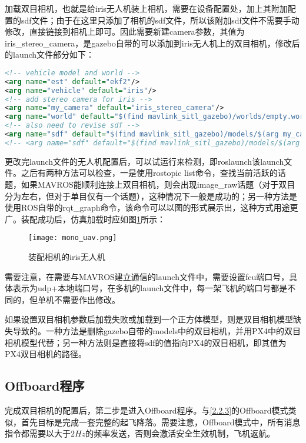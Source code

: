 加载双目相机，也就是给iris无人机装上相机，需要在设备配置处，加上其附加配置的sdf文件；由于在这里只添加了相机的sdf文件，所以该附加sdf文件不需要手动修改，直接链接到相机上即可。因此需要新建camera参数，其值为iris\_stereo\_camera，是gazebo自带的可以添加到iris无人机上的双目相机，修改后的launch文件部分如下：

\begin{lstlisting}[language={XML}]
<!-- vehicle model and world -->
<arg name="est" default="ekf2"/>
<arg name="vehicle" default="iris"/>
<!-- add stereo camera for iris -->
<arg name="my_camera" default="iris_stereo_camera"/>
<arg name="world" default="$(find mavlink_sitl_gazebo)/worlds/empty.world"/>
<!-- also need to revise sdf -->
<arg name="sdf" default="$(find mavlink_sitl_gazebo)/models/$(arg my_camera)/$(arg my_camera).sdf"/>
<!-- <arg name="sdf" default="$(find mavlink_sitl_gazebo)/models/$(arg vehicle)/$(arg vehicle).sdf"/> -->
\end{lstlisting}

更改完launch文件的无人机配置后，可以试运行来检测，即roslaunch该launch文件。之后有两种方法可以检查，一是使用rostopic list命令，查找当前活跃的话题，如果MAVROS能顺利连接上双目相机，则会出现image\_raw话题（对于双目分为左右，但对于单目仅有一个话题），这种情况下一般是成功的；另一种方法是使用ROS自带的rqt\_graph命令，该命令可以以图的形式展示出，这种方式用途更广。装配成功后，仿真加载时应如图\ref{fig4-2}所示：


\begin{figure}[!ht]
	\centering
	\texttt{[image: mono\_uav.png]}
	\caption{装配相机的iris无人机}
	\label{fig4-2}
\end{figure}

需要注意，在需要与MAVROS建立通信的launch文件中，需要设置fcu端口号，具体表示为udp+本地端口号，在多机的launch文件中，每一架飞机的端口号都是不同的，但单机不需要作出修改。

如果设置双目相机参数后加载失败或加载到一个正方体模型，则是双目相机模型缺失导致的。一种方法是删除gazebo自带的models中的双目相机，并用PX4中的双目相机模型代替；另一种方法则是直接将sdf的值指向PX4的双目相机，即其值为PX4双目相机的路径。

\subsection{Offboard程序} \label{4.2.2}

完成双目相机的配置后，第二步是进入Offboard程序。与\ref{2.2.3}的Offboard模式类似，首先目标是完成一套完整的起飞降落。需要注意，Offboard模式中，所有消息指令都需要以大于$2Hz$的频率发送，否则会激活安全生效机制，飞机返航。

